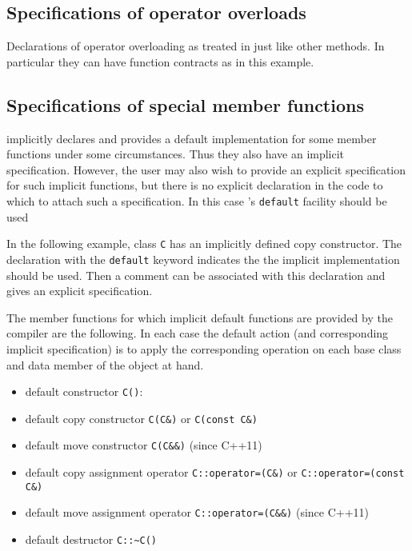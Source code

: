 
\subsection{Specifications of operator overloads}
Declarations of operator overloading as treated in \NAME just like other
methods. In particular they can have function contracts as in this example.



\subsection{Specifications of special member functions}

\lang implicitly declares and provides a default implementation for some member functions under some circumstances. 
Thus they also have an implicit specification. However, the user may also wish to provide an explicit specification for such implicit functions, but there is no
explicit declaration in the \lang code to which to attach such a 
specification. In this case \lang's \lstinline|default| facility should be used

In the following example, class \lstinline|C| has an implicitly
defined copy constructor. The declaration with the \lstinline|default|
keyword indicates the the implicit implementation should be used.
Then a \NAME comment can be associated with this declaration and gives
an explicit specification.



The member functions for which implicit default functions are provided by the compiler are the following. In each case the default action (and corresponding implicit specification) is to apply the corresponding operation on each base class and data member of the object at hand.
\begin{itemize}
	\item default constructor \lstinline|C()|: 
	\item default copy constructor \lstinline|C(C&)| or \lstinline|C(const C&)|
	\item default move constructor \lstinline|C(C&&)| (since C++11)
	\item default copy assignment operator \lstinline|C::operator=(C&)| or \lstinline|C::operator=(const C&)|
	\item default move assignment operator \lstinline|C::operator=(C&&)| (since C++11)
	\item default destructor \lstinline|C::~C()|
\end{itemize}

